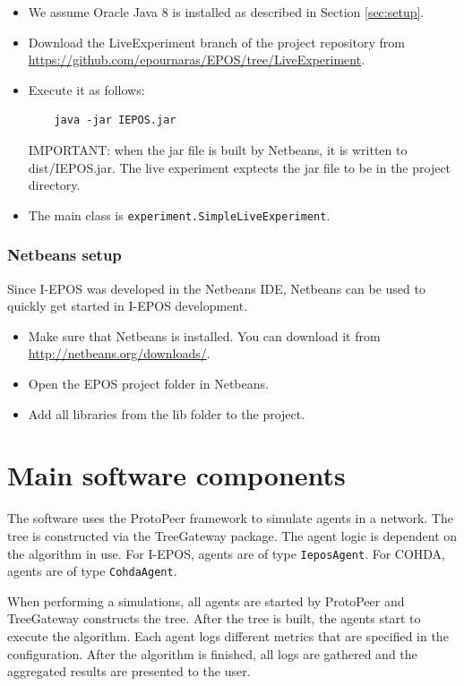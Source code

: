 \documentclass[11pt]{article} %
\newcommand{\code}{\texttt}
\begin{document}
\begin{itemize}
	\item We assume Oracle Java 8 is installed as described in Section \ref{sec:setup}.
	\item Download the LiveExperiment branch of the project repository from \url{https://github.com/epournaras/EPOS/tree/LiveExperiment}.
	\item Execute it as follows:
	\begin{verbatim}
	java -jar IEPOS.jar
	\end{verbatim}
	IMPORTANT: when the jar file is built by Netbeans, it is written to dist/IEPOS.jar.
	The live experiment exptects the jar file to be in the project directory.
	\item The main class is \code{experiment.SimpleLiveExperiment}.
\end{itemize}
\subsubsection*{Netbeans setup}
Since I-EPOS was developed in the Netbeans IDE, Netbeans can be used to quickly get started in I-EPOS development.
\begin{itemize}
	\item Make sure that Netbeans is installed. You can download it from \url{http://netbeans.org/downloads/}.
	\item Open the EPOS project folder in Netbeans.
	\item Add all libraries from the lib folder to the project.
\end{itemize}

\newpage
\section{Main software components}
The software uses the ProtoPeer framework to simulate agents in a network. The tree is constructed via the TreeGateway package. The agent logic is dependent on the algorithm in use. For I-EPOS, agents are of type \code{IeposAgent}. For COHDA, agents are of type \code{CohdaAgent}.

When performing a simulations, all agents are started by ProtoPeer and TreeGateway constructs the tree. After the tree is built, the agents start to execute the algorithm.
Each agent logs different metrics that are specified in the configuration. After the algorithm is finished, all logs are gathered and the aggregated results are presented to the user.

\newpage
\end{document}
